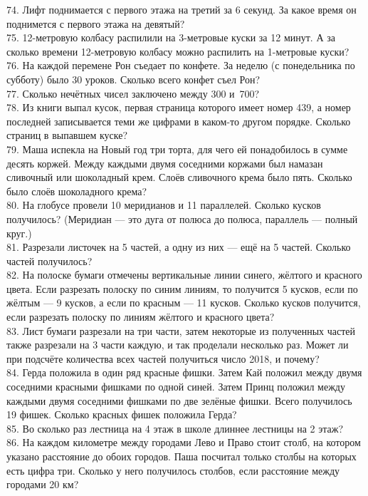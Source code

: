74. Лифт поднимается с первого этажа на третий за 6 секунд. За какое время он поднимется с первого этажа на девятый?\\
75. 12-метровую колбасу распилили на 3-метровые куски за 12 минут. А за сколько времени 12-метровую колбасу можно распилить на 1-метровые куски?\\
76. На каждой перемене Рон съедает по конфете. За неделю (с понедельника по субботу) было 30 уроков. Сколько всего конфет съел Рон?\\
77. Сколько нечётных чисел заключено между 300 и 700?\\
78. Из книги выпал кусок, первая страница которого имеет номер 439, а номер последней записывается теми же цифрами в каком-то другом порядке. Сколько страниц в выпавшем куске?\\
79. Маша испекла на Новый год три торта, для чего ей понадобилось в сумме десять коржей. Между каждыми двумя соседними коржами был намазан сливочный или шоколадный крем. Слоёв сливочного крема было пять. Сколько было слоёв шоколадного крема?\\
80. На глобусе провели 10 меридианов и 11 параллелей. Сколько кусков получилось? (Меридиан --- это дуга от полюса до полюса, параллель --– полный круг.)\\
81. Разрезали листочек на 5 частей, а одну из них --- ещё на 5 частей. Сколько частей получилось?\\
82. На полоске бумаги отмечены вертикальные линии синего, жёлтого и красного цвета. Если разрезать полоску по синим линиям, то получится 5 кусков, если по жёлтым --- 9 кусков, а если по красным --- 11 кусков. Сколько кусков получится, если разрезать полоску по линиям жёлтого и красного цвета?\\
83. Лист бумаги разрезали на три части, затем некоторые из полученных частей также разрезали на 3 части каждую, и так проделали несколько раз. Может ли при подсчёте количества всех частей получиться число 2018, и почему?\\
84. Герда положила в один ряд красные фишки. Затем Кай положил между двумя соседними красными фишками по одной синей. Затем Принц положил между каждыми двумя соседними фишками по две зелёные фишки. Всего получилось 19 фишек. Сколько красных фишек положила Герда?\\
85. Во сколько раз лестница на 4 этаж в школе длиннее лестницы на 2 этаж?\\
86. На каждом километре между городами Лево и Право стоит столб, на котором указано расстояние до обоих городов. Паша посчитал только столбы на которых есть цифра три. Сколько у него получилось столбов, если расстояние между городами 20 км?\\

